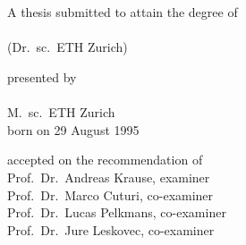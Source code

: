 \begin{titlepage}
    \begin{center}
        \large
        \begingroup
        \endgroup

        \hfill

        \vfill

        \begingroup
            \spacedallcaps{\myTitle}\\
            \vspace{5pt}\spacedallcaps{\footnotesize \mySubtitle}\\
        \endgroup

        \vfill

        \begingroup
            A thesis submitted to attain the degree of\\
            \vspace{0.5em}
             \\
            (Dr.\ sc.\ ETH Zurich)
        \endgroup

        \vfill

        \begingroup
            presented by\\
            \vspace{0.5em}
            \spacedallcaps{\normalsize \myName} \\
            M.\ sc.\ ETH Zurich \\
            \vspace{0.5em}
            born on 29 August 1995\\
        \endgroup

        \vfill

        \begingroup
            accepted on the recommendation of\\
            \vspace{0.5em}
            Prof.\ Dr.\ Andreas Krause, examiner \\
            Prof.\ Dr.\ Marco Cuturi, co-examiner \\
            Prof.\ Dr.\ Lucas Pelkmans, co-examiner \\
            Prof.\ Dr.\ Jure Leskovec, co-examiner \\
        \endgroup

        \vfill

        \myTime%

        \vfill
    \end{center}
\end{titlepage}
